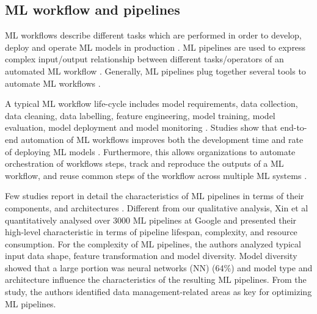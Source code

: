 \subsection{ML workflow and pipelines}

ML workflows describe different tasks which are performed in order to develop, deploy and operate ML models in production \cite{Amershi2019}. ML pipelines are used to express complex input/output relationship between 
different tasks/operators of an automated ML workflow \cite{Doris2021MLPipelines}. Generally, ML pipelines plug together several tools to automate ML workflows \cite{Hummer2019IBM}.

A typical ML workflow life-cycle includes model requirements, data collection, data cleaning, data labelling, feature engineering, model training, model evaluation, model deployment and model monitoring \cite{Amershi2019}. Studies show that end-to-end automation of ML workflows improves both the development time and rate of deploying ML models \cite{Hummer2019IBM,Doris2021MLPipelines}. Furthermore, this allows organizations to automate orchestration of workflows steps, track and reproduce the outputs of a ML workflow, and reuse common steps of the workflow across multiple ML systems \cite{Baylor2017, Hummer2019IBM}. %

Few studies report in detail the characteristics of ML pipelines in terms of their components, and architectures \cite{Hummer2019IBM,Doris2021MLPipelines}. Different from our qualitative analysis, Xin et al \cite{Doris2021MLPipelines} quantitatively analysed over 3000 ML pipelines at Google and presented their high-level characteristic in terms of pipeline lifespan, complexity, and resource consumption. For the complexity of ML pipelines, the authors analyzed typical input data shape, feature transformation and model diversity. Model diversity showed that a large portion was neural networks (NN) (64\%) and model type and architecture influence the characteristics of the resulting ML pipelines. %
From the study, the authors \cite{Doris2021MLPipelines} identified data management-related areas as key for optimizing ML pipelines. %

